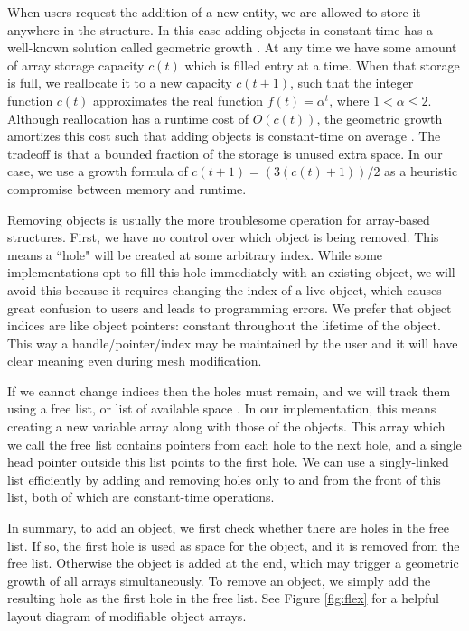 When users request the addition of a new entity, we are allowed
to store it anywhere in the structure.
In this case adding objects in constant time has a well-known
solution called geometric growth \cite{cormen2001table}.
At any time we have some amount of array storage capacity $c(t)$
which is filled entry at a time.
When that storage is full, we reallocate it to a new capacity $c(t+1)$,
such that the integer function $c(t)$ approximates the real function
$f(t) = \alpha^t$, where $1< \alpha\leq 2$.
Although reallocation has a runtime cost of $O(c(t))$, the geometric
growth amortizes this cost such that adding objects
is constant-time on average \cite{cormen2001table}.
The tradeoff is that a bounded fraction of the storage is unused extra space.
In our case, we use a growth formula of $c(t+1) = (3(c(t)+1))/2$
as a heuristic compromise between memory and runtime.

Removing objects is usually the more troublesome operation for
array-based structures.
First, we have no control over which object is being removed.
This means a ``hole" will be created at some arbitrary index.
While some implementations opt to fill this hole immediately
with an existing object, we will avoid this because it requires
changing the index of a live object,
which causes great confusion to users
and leads to programming errors.
We prefer that object indices are like object pointers: constant
throughout the lifetime of the object.
This way a handle/pointer/index may be maintained by the user
and it will have clear meaning even during mesh modification.

If we cannot change indices then the holes must remain, and
we will track them using a free list, or list of available
space \cite{knuth1997list}.
In our implementation, this means creating a new variable array
along with those of the objects.
This array which we call the free list contains pointers
from each hole to the next hole,
and a single head pointer outside this list
points to the first hole.
We can use a singly-linked list efficiently by adding and
removing holes only to and from the front of this list,
both of which are constant-time operations.

In summary, to add an object, we first check whether there
are holes in the free list.
If so, the first hole is used as space for the object,
and it is removed from the free list.
Otherwise the object is added at the end,
which may trigger a geometric growth of all arrays
simultaneously.
To remove an object, we simply add the resulting hole as the first hole
in the free list.
See Figure \ref{fig:flex} for a helpful layout diagram
of modifiable object arrays.

